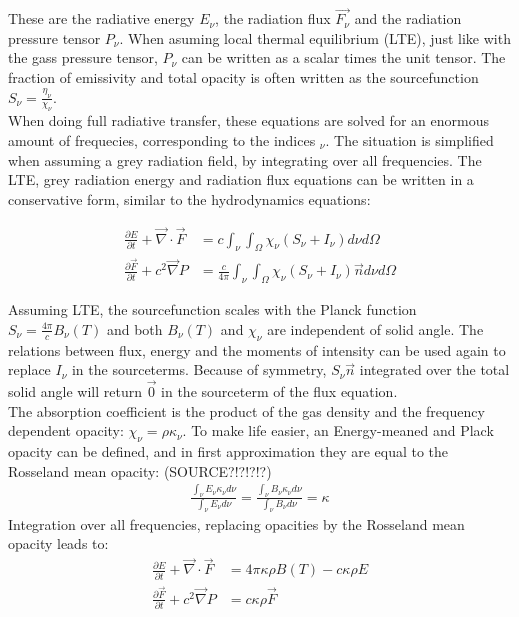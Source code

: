 These are the radiative energy $E_\nu$, the radiation flux $\vec{F_\nu}$ and the radiation pressure tensor $P_\nu$. When asuming local thermal equilibrium (LTE), just like with the gass pressure tensor, $P_\nu$ can be written as a scalar times the unit tensor. The fraction of emissivity and total opacity is often written as the sourcefunction $S_\nu = \frac{\eta_\nu}{\chi_\nu}$. \\
 When doing full radiative transfer, these equations are solved for an enormous amount of frequecies, corresponding to the indices $_\nu$. The situation is simplified when assuming a grey radiation field, by integrating over all frequencies. The LTE, grey radiation energy and radiation flux equations can be written in a conservative form, similar to the hydrodynamics equations:

\begin{align}
\frac{\partial E}{\partial t} + \vec{\nabla} \cdot \vec{F} &= c \int_\nu \int_\Omega \chi_\nu \left( S_\nu + I_\nu \right) d\nu d\Omega \\
\frac{\partial \vec{F}}{\partial t} + c^2 \vec{\nabla} P &= \frac{c}{4 \pi} \int_\nu \int_\Omega \chi_\nu \left( S_\nu + I_\nu \right) \vec{n} d\nu d\Omega
\end{align}

Assuming LTE, the sourcefunction scales with the Planck function $S_\nu = \frac{4\pi}{c} B_\nu(T)$ and both $B_\nu(T)$ and $\chi_\nu$ are independent of solid angle. The relations between flux, energy and the moments of intensity can be used again to replace $I_\nu$ in the sourceterms. Because of symmetry, $S_\nu \vec{n}$ integrated over the total solid angle will return $\vec{0}$ in the sourceterm of the flux equation.\\
The absorption coefficient is the product of the gas density and the frequency dependent opacity: $\chi_\nu = \rho \kappa_\nu$. To make life easier, an Energy-meaned and Plack opacity can be defined, and in first approximation they are equal to the Rosseland mean opacity: (SOURCE?!?!?!?)
\begin{align}
\frac{\int_\nu E_\nu \kappa_\nu d\nu}{\int_\nu E_\nu d\nu} = \frac{\int_\nu B_\nu \kappa_\nu d\nu}{\int_\nu B_\nu d\nu} = \kappa
\end{align}
Integration over all frequencies, replacing opacities by the Rosseland mean opacity leads to:
\begin{align}
\frac{\partial E}{\partial t} + \vec{\nabla} \cdot \vec{F} &= 4\pi \kappa\rho B(T) - c \kappa \rho E\\
\frac{\partial \vec{F}}{\partial t} + c^2 \vec{\nabla} P &=  c \kappa \rho \vec{F} 
\end{align}

